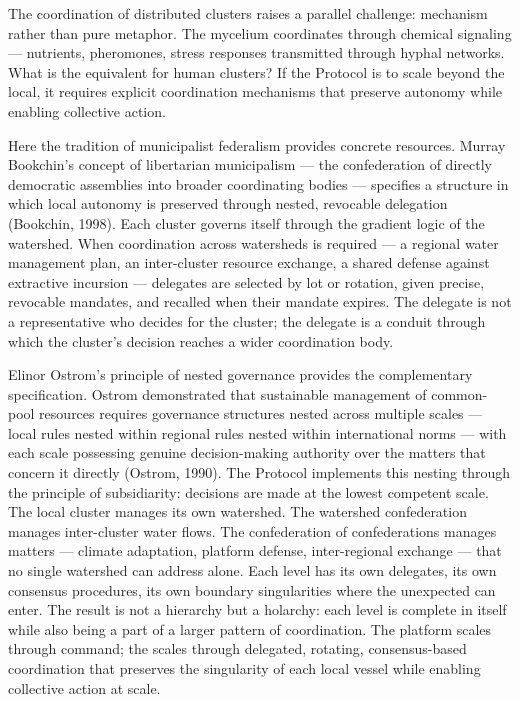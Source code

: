 The coordination of distributed clusters raises a parallel challenge: mechanism rather than pure metaphor. The mycelium coordinates through chemical signaling — nutrients, pheromones, stress responses transmitted through hyphal networks. What is the equivalent for human clusters? If the  Protocol is to scale beyond the local, it requires explicit coordination mechanisms that preserve autonomy while enabling collective action.

Here the tradition of municipalist federalism provides concrete resources. Murray Bookchin's concept of libertarian municipalism — the confederation of directly democratic assemblies into broader coordinating bodies — specifies a structure in which local autonomy is preserved through nested, revocable delegation (Bookchin, 1998). Each cluster governs itself through the gradient logic of the watershed. When coordination across watersheds is required — a regional water management plan, an inter-cluster resource exchange, a shared defense against extractive incursion — delegates are selected by lot or rotation, given precise, revocable mandates, and recalled when their mandate expires. The delegate is not a representative who decides for the cluster; the delegate is a conduit through which the cluster's decision reaches a wider coordination body.

Elinor Ostrom's principle of nested governance provides the complementary specification. Ostrom demonstrated that sustainable management of common-pool resources requires governance structures nested across multiple scales — local rules nested within regional rules nested within international norms — with each scale possessing genuine decision-making authority over the matters that concern it directly (Ostrom, 1990). The  Protocol implements this nesting through the principle of subsidiarity: decisions are made at the lowest competent scale. The local cluster manages its own watershed. The watershed confederation manages inter-cluster water flows. The confederation of confederations manages matters — climate adaptation, platform defense, inter-regional exchange — that no single watershed can address alone. Each level has its own delegates, its own consensus procedures, its own boundary singularities where the unexpected can enter. The result is not a hierarchy but a holarchy: each level is complete in itself while also being a part of a larger pattern of coordination. The platform scales through command; the  scales through delegated, rotating, consensus-based coordination that preserves the singularity of each local vessel while enabling collective action at scale.

